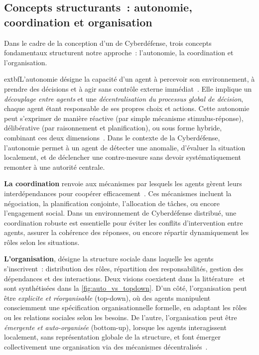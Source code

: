 \subsection*{Concepts structurants~: autonomie, coordination et organisation}

Dans le cadre de la conception d'un  de Cyberdéfense, trois concepts fondamentaux structurent notre approche~: l'autonomie, la coordination et l'organisation.

extbf{L'autonomie} désigne la capacité d'un agent à percevoir son environnement, à prendre des décisions et à agir sans contrôle externe immédiat~\cite{Russell2010,Boissier2003}. Elle implique un \textit{découplage entre agents} et une \textit{décentralisation du processus global de décision}, chaque agent étant responsable de ses propres choix et actions. Cette autonomie peut s'exprimer de manière réactive (par simple mécanisme stimulus-réponse), délibérative (par raisonnement et planification), ou sous forme hybride, combinant ces deux dimensions~\cite{Georgeff1987}. Dans le contexte de la Cyberdéfense, l'autonomie permet à un agent de détecter une anomalie, d'évaluer la situation localement, et de déclencher une contre-mesure sans devoir systématiquement remonter à une autorité centrale.

\textbf{La coordination} renvoie aux mécanismes par lesquels les agents gèrent leurs interdépendances pour coopérer efficacement~\cite{Durfee2001, Jennings1996, Sandholm1999}. Ces mécanismes incluent la négociation, la planification conjointe, l'allocation de tâches, ou encore l'engagement social. Dans un environnement de Cyberdéfense distribué, une coordination robuste est essentielle pour éviter les conflits d'intervention entre agents, assurer la cohérence des réponses, ou encore répartir dynamiquement les rôles selon les situations.

\textbf{L'organisation}, désigne la structure sociale dans laquelle les agents s'inscrivent~: distribution des rôles, répartition des responsabilités, gestion des dépendances et des interactions. Deux visions coexistent dans la littérature~\cite{Picard2009reorganisation} et sont synthétisées dans la \autoref{fig:auto_vs_topdown}. D'un côté, l'organisation peut être \emph{explicite et réorganisable} (top-down), où des agents manipulent consciemment une spécification organisationnelle formelle, en adaptant les rôles ou les relations sociales selon les besoins. De l'autre, l'organisation peut être \emph{émergente et auto-organisée} (bottom-up), lorsque les agents interagissent localement, sans représentation globale de la structure, et font émerger collectivement une organisation via des mécanismes décentralisés~\cite{Heylighen1999, DiMarzoSerugendo2006}.

